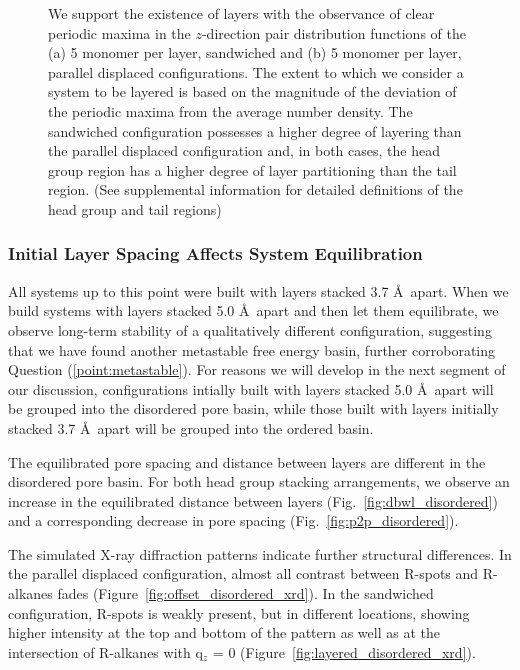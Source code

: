 \documentclass[journal=jpcbfk,manusciprt=article]{achemso}
\begin{document}
\begin{figure}
\begin{subfigure}{0.45\textwidth}
                \caption{}\label{fig:zdf_offset}
        \end{subfigure}
	\caption{We support the existence of layers with the observance of
		clear periodic maxima in the $z$-direction pair distribution functions of the
		(a) 5 monomer per layer, sandwiched and (b) 5 monomer per layer, parallel
		displaced configurations. The extent to which we consider a system to be
		layered is based on the magnitude of the deviation of the periodic maxima from
		the average number density. The sandwiched configuration possesses a higher
		degree of layering than the parallel displaced configuration and, in both
		cases, the head group region has a higher degree of layer partitioning than the
		tail region. (See supplemental information for detailed definitions of the head
		group and tail regions)}\label{fig:zdf}
  \end{figure}

  \subsubsection{Initial Layer Spacing Affects System Equilibration}

  All systems up to this point were built with layers stacked 3.7 \AA~apart.
  When we build systems with layers stacked 5.0 \AA~apart and then let them
  equilibrate, we observe long-term stability of a qualitatively different
  configuration, suggesting that we have found another metastable free energy
  basin, further corroborating Question (\ref{point:metastable}). 
  For reasons we will develop in the next segment of our
  discussion, configurations intially built with layers stacked 5.0 \AA~apart 
  will be grouped into the disordered pore basin, while those built with layers
  initially stacked 3.7 \AA~apart will be grouped into the ordered basin.

  The equilibrated pore spacing and distance between layers are different in
  the disordered pore basin. For both head group stacking arrangements, we
  observe an increase in the equilibrated distance between layers
  (Fig.~\ref{fig:dbwl_disordered}) and a corresponding decrease in pore spacing
  (Fig.~\ref{fig:p2p_disordered}).

  The simulated X-ray diffraction patterns indicate further structural
  differences. In the parallel displaced configuration, almost all contrast
  between R-spots and R-alkanes fades (Figure~\ref{fig:offset_disordered_xrd}).
  In the sandwiched configuration, R-spots is weakly present, but in different
  locations, showing higher intensity at the top and bottom of the pattern as
  well as at the intersection of R-alkanes with q$_z$ = 0
  (Figure~\ref{fig:layered_disordered_xrd}). 
\end{document}
